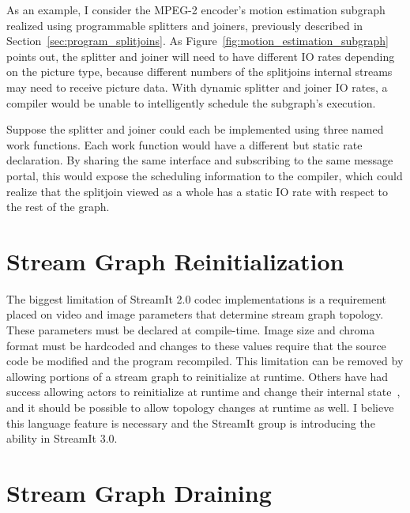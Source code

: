 As an example, I consider the MPEG-2 encoder's motion estimation 
subgraph realized using programmable splitters and joiners, previously
described in Section~\ref{sec:program_splitjoins}. As 
Figure~\ref{fig:motion_estimation_subgraph} points out, the splitter
and joiner will need to have different IO rates depending on the 
picture type, because different numbers of the splitjoins
internal streams may need to receive picture data.
With dynamic splitter and joiner IO rates, a compiler would be unable to 
intelligently schedule the subgraph's execution.

Suppose the splitter and joiner could each be implemented using 
three named work functions. Each work function would have a different but
static rate declaration. By sharing the same interface and subscribing
to the same message portal, this would expose the scheduling information
to the compiler, which could realize that the splitjoin viewed as a whole
has a static IO rate with respect to the rest of the graph. 

\section{Stream Graph Reinitialization}

The biggest limitation of StreamIt 2.0 codec implementations
is a requirement placed on video and image parameters that determine 
stream graph topology. These parameters must be declared at compile-time. 
Image size and chroma format must be hardcoded and changes to these values 
require that the source code be modified and the program recompiled. 
This limitation can be removed by allowing portions of a stream graph 
to reinitialize at runtime. Others have had success allowing actors to
reinitialize at runtime and change their internal 
state~\cite{neuendorffer04hierarchical}, and it should be possible
to allow topology changes at runtime as well. I believe this language
feature is necessary  and the StreamIt group is introducing the ability
in StreamIt 3.0.

\section{Stream Graph Draining}

